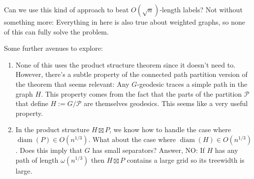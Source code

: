 \documentclass{patmorin}
\DeclareMathOperator{\diam}{diam}
\begin{document}
Can we use this kind of approach to beat $O(\sqrt{n})$-length labels?
Not without something more: Everything in here is also true about weighted graphs, so none of this can fully solve the problem.








Some further avenues to explore:
\begin{enumerate}
    \item None of this uses the product structure theorem since it doesn't need to.  However, there's a subtle property of the connected path partition version of the theorem that seems relevant:  Any $G$-geodesic traces a simple path in the graph $H$.  This property comes from the fact that the parts of the partition $\mathcal{P}$ that define $H:=G/\mathcal{P}$ are themselves geodesics.  This seems like a very useful property.

    \item In the product structure $H\boxtimes P$, we know how to handle the case where $\diam(P)\in O(n^{1/3})$.  What about the case where $\diam(H)\in O(n^{1/3})$.  Does this imply that $G$ has small separators?  Answer, NO: If $H$ has any path of length $\omega(n^{1/3})$ then $H\boxtimes P$ contains a large grid so its treewidth is large.

\end{enumerate}













\end{document}
